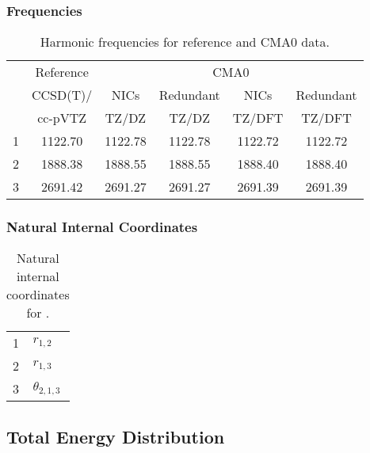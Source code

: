 \documentclass[10pt,oneside]{article}
\begin{document}
\begin{table}[h!]
\subsubsection*{Frequencies}
\centering
\caption{Harmonic frequencies for reference and CMA0 data.}
\begin{tabular}{cccccc}
\toprule
{} & Reference & \multicolumn{4}{c}{CMA0} \\
{} &  CCSD(T)/ &    NICs &  Redundant &    NICs & Redundant \\
{} &   cc-pVTZ &   TZ/DZ &      TZ/DZ &  TZ/DFT &    TZ/DFT \\
\midrule
1 &   1122.70 & 1122.78 &    1122.78 & 1122.72 &   1122.72 \\
2 &   1888.38 & 1888.55 &    1888.55 & 1888.40 &   1888.40 \\
3 &   2691.42 & 2691.27 &    2691.27 & 2691.39 &   2691.39 \\
\bottomrule
\end{tabular}
\end{table}

\begin{table}[h!]
\subsubsection*{Natural Internal Coordinates}
\centering
\caption{Natural internal coordinates for .}
\small
\begin{tabular}{ll}
\toprule
  1   & $r_{1,2}$ \\
  2   & $r_{1,3}$ \\
  3   & $\theta_{2,1,3}$ \\
\bottomrule
\end{tabular}
\end{table}

\begin{table}
\subsection*{Total Energy Distribution}
\centering\end{table}

\clearpage

\subsection{}
\end{document}
